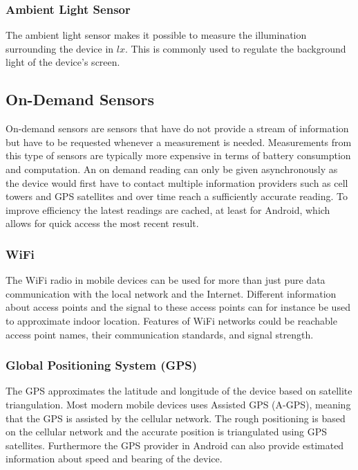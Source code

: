 \subsubsection{Ambient Light Sensor}

The ambient light sensor makes it possible to measure the illumination surrounding the device in $lx$. This is commonly used to regulate the background light of the device's screen.


\subsection{On-Demand Sensors}
On-demand sensors are sensors that have do not provide a stream of information but have to be requested whenever a measurement is needed. Measurements from this type of sensors are typically more expensive in terms of battery consumption and computation. An on demand reading can only be given asynchronously as the device would first have to contact multiple information providers such as cell towers and GPS satellites and over time reach a sufficiently accurate reading. To improve efficiency the latest readings are cached, at least for Android, which allows for quick access the most recent result.

\subsubsection{WiFi}
The WiFi radio in mobile devices can be used for more than just pure data communication with the local network and the Internet. Different information about access points and the signal to these access points can for instance be used to approximate indoor location.  
Features of WiFi networks could be reachable access point names, their communication standards, and signal strength. 

\subsubsection{Global Positioning System (GPS)}
The GPS approximates the latitude and longitude of the device based on satellite triangulation. Most modern mobile devices uses Assisted GPS (A-GPS), meaning that the GPS is assisted by the cellular network. The rough positioning is based on the cellular network and the accurate position is triangulated using GPS satellites. Furthermore the GPS provider in Android can also provide estimated information about speed and bearing of the device.

